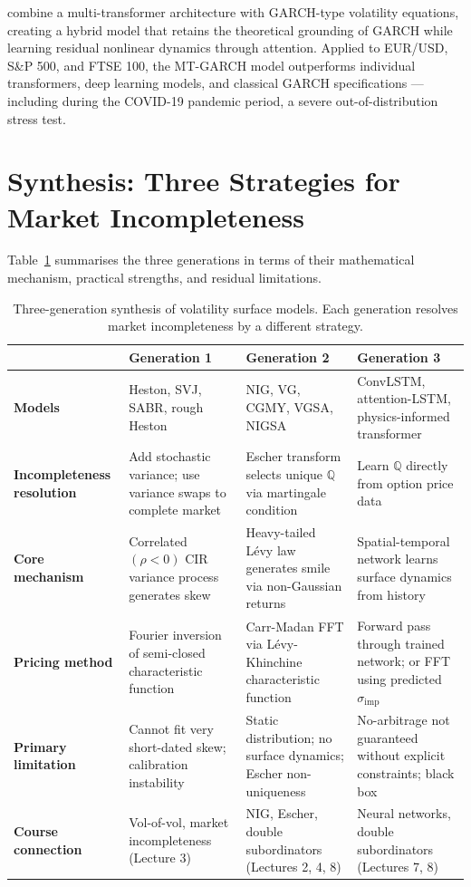 \documentclass[12pt, a4paper]{article}
\begin{document}
\citet{mishra2024} combine a multi-transformer architecture with
GARCH-type volatility equations, creating a hybrid model that retains
the theoretical grounding of GARCH while learning residual nonlinear
dynamics through attention. Applied to EUR/USD, S\&P 500, and FTSE 100,
the MT-GARCH model outperforms individual transformers, deep learning
models, and classical GARCH specifications --- including during the
COVID-19 pandemic period, a severe out-of-distribution stress test.

\section{Synthesis: Three Strategies for Market Incompleteness}

Table~\ref{tab:synthesis} summarises the three generations in terms of
their mathematical mechanism, practical strengths, and residual
limitations.

\begin{table}[H]
\centering
\caption{Three-generation synthesis of volatility surface models.
Each generation resolves market incompleteness by a different strategy.}
\label{tab:synthesis}
\renewcommand{\arraystretch}{1.4}
\begin{tabular}{p{2.4cm}p{3.2cm}p{3.5cm}p{3.5cm}}
\toprule
 & \textbf{Generation 1} & \textbf{Generation 2}
 & \textbf{Generation 3} \\
\midrule
\textbf{Models}
  & Heston, SVJ, SABR, rough Heston
  & NIG, VG, CGMY, VGSA, NIGSA
  & ConvLSTM, attention-LSTM, physics-informed transformer \\
\midrule
\textbf{Incompleteness resolution}
  & Add stochastic variance; use variance swaps to complete market
  & Escher transform selects unique $\mathbb{Q}$ via martingale condition
  & Learn $\mathbb{Q}$ directly from option price data \\
\midrule
\textbf{Core mechanism}
  & Correlated $(\rho < 0)$ CIR variance process generates skew
  & Heavy-tailed L\'{e}vy law generates smile via non-Gaussian returns
  & Spatial-temporal network learns surface dynamics from history \\
\midrule
\textbf{Pricing method}
  & Fourier inversion of semi-closed characteristic function
  & Carr-Madan FFT via L\'{e}vy-Khinchine characteristic function
  & Forward pass through trained network; or FFT using predicted $\sigma_{\mathrm{imp}}$ \\
\midrule
\textbf{Primary limitation}
  & Cannot fit very short-dated skew; calibration instability
  & Static distribution; no surface dynamics; Escher non-uniqueness
  & No-arbitrage not guaranteed without explicit constraints; black box \\
\midrule
\textbf{Course connection}
  & Vol-of-vol, market incompleteness (Lecture 3)
  & NIG, Escher, double subordinators (Lectures 2, 4, 8)
  & Neural networks, double subordinators (Lectures 7, 8) \\
\bottomrule
\end{tabular}
\end{table}
\end{document}
